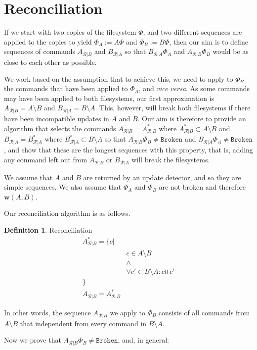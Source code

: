 \documentclass[12pt]{article}
\newcommand{\fsbroken}{\mathtt{Broken}} %
\newcommand{\FS}{\Phi} %
\newcommand{\indep}{\wr\!\!\wr\,} %
\newcommand{\works}[1]{{\mathbf{w}}({#1})}
\newcommand{\ordered}[1]{#1}
\newcommand{\recchar}[3]{{#1}^{#3}_{\mathcal{R}|{#2}}}
\newcommand{\reca}{\recchar{A}{B}{}} %
\newcommand{\recb}{\recchar{B}{A}{}}
\newcommand{\recaset}{\recchar{A}{B}{*}}
\newcommand{\recbset}{\recchar{B}{A}{*}}
\theoremstyle{definition}
\newtheorem{mydef}{Definition}
\begin{document}
\section{Reconciliation}

If we start with two copies of the filesystem $\FS$,
and two different sequences are applied to the copies to yield $\FS_A:=A\FS$
and $\FS_B:=B\FS$, then our aim is to define sequences of commands $\reca$ and $\recb$
so that $\recb\FS_A$ and $\reca\FS_B$ would be as close to each other as possible.

We work based on the assumption that to achieve this, we need
to apply to $\FS_B$ the commands that have been applied to $\FS_A$, and \emph{vice versa}.
As some commands may have been applied to both filesystems, our first approximation
is $\reca = \ordered{A\setminus B}$ and $\recb = \ordered{B\setminus A}$.
This, however, will break both filesystems if there have been incompatible updates
in $A$ and $B$. 
Our aim is therefore to provide an algorithm that selects the commands 
$\reca = \ordered{\recaset}$  where $\recaset \subset A\setminus B$
and $\recb = \ordered{\recbset}$ where $\recbset \subset B\setminus A$ 
so that $\reca\FS_B\neq\fsbroken$ and $\recb\FS_A\neq\fsbroken$,
and show that these are the longest sequences with this property, that is,
adding any command left out from $\reca$ or $\recb$ will break the filesystems.

We assume that $A$ and $B$ are returned by an update detector,
and so they are simple sequences.
We also assume that $\FS_A$ and $\FS_B$ are not broken and therefore $\works{A,B}$.

Our reconciliation algorithm is as follows.

\begin{mydef}{Reconciliation}\label{def:reconciliation}
\begin{align*}
\recaset = \{c| & \\
& c\in A\setminus B \\
& \wedge \\
& \forall c'\in B\setminus A: c\indep c'\\
\} & \\
\reca = \ordered{\recaset}&
\end{align*}

In other words, the sequence $\reca$ we apply to $\FS_B$ consists of all commands from $A\setminus B$
that independent from every command in $B\setminus A$.
\end{mydef}

Now we prove that $\reca\FS_B\neq\fsbroken$, and, in general:
\end{document}
